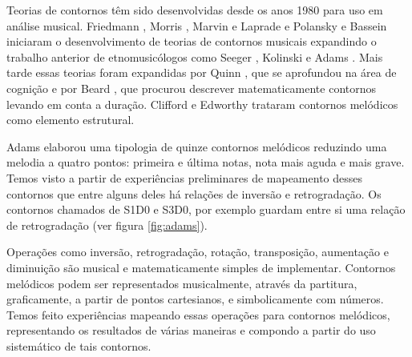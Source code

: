 \documentclass{article}
\begin{document}

Teorias de contornos têm sido desenvolvidas desde os anos 1980 para
uso em análise musical. Friedmann
\cite{friedmann85:_method_discus_contour,friedmann1987rmc}, Morris
\cite{morris1987cpc}, Marvin e Laprade
\cite{marvin87:_relat_music_contour} e Polansky e Bassein
\cite{polansky92:_possib_impos_melod} iniciaram o desenvolvimento de
teorias de contornos musicais expandindo o trabalho anterior de
etnomusicólogos como Seeger \cite{seeger1960mml}, Kolinski
\cite{kolinkski65:_struc_melod_movem} e Adams
\cite{adams1976mct}.
Mais tarde essas teorias foram expandidas por
Quinn \cite{quinn97:_fuzzy_exten_theor_contour}, que se aprofundou na
área de cognição e por Beard \cite{beard2003cmm}, que procurou
descrever matematicamente contornos levando em conta a duração.
Clifford \cite{clifford1995cse} e Edworthy \cite{edworthy1985mca}
trataram contornos melódicos como elemento estrutural.


Adams \cite{adams1976mct} elaborou uma tipologia de quinze contornos
melódicos reduzindo uma melodia a quatro pontos: primeira e última
notas, nota mais aguda e mais grave. Temos visto a partir de
experiências preliminares de mapeamento desses contornos que entre
alguns deles há relações de inversão e retrogradação. Os contornos
chamados de S1D0 e S3D0, por exemplo guardam entre si uma relação de
retrogradação (ver figura \ref{fig:adams}).


Operações como inversão, retrogradação, rotação, transposição,
aumentação e diminuição são musical e matematicamente simples de
implementar. Contornos melódicos podem ser representados musicalmente,
através da partitura, graficamente, a partir de pontos cartesianos, e
simbolicamente com números. Temos feito experiências mapeando essas
operações para contornos melódicos, representando os resultados de
várias maneiras e compondo a partir do uso sistemático de tais
contornos.
\end{document}
